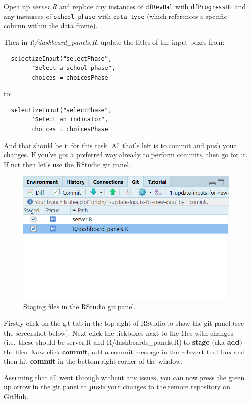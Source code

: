 \documentclass[
  12pt,
]{article}
\begin{document}
Open up \emph{server.R} and replace any instances of \texttt{dfRevBal}
with \texttt{dfProgressHE} and any instances of \texttt{school\_phase}
with \texttt{data\_type} (which references a specific column within the
data frame).

Then in \emph{R/dashboard\_panels.R}, update the titles of the input
boxes from:

\begin{verbatim}
  selectizeInput("selectPhase",
        "Select a school phase",
        choices = choicesPhase
\end{verbatim}

to:

\begin{verbatim}
  selectizeInput("selectPhase",
        "Select an indicator",
        choices = choicesPhase
\end{verbatim}

And that should be it for this task. All that's left is to commit and
push your changes. If you've got a preferred way already to perform
commits, then go for it. If not then let's use the RStudio git panel.

\begin{figure}

{\centering \includegraphics[width=0.64\linewidth]{images/gitdemo/gitdemo-RStudio-gitpanel} 

}

\caption{Staging files in the RStudio git panel.}\label{fig:unnamed-chunk-12}
\end{figure}

Firstly click on the git tab in the top right of RStudio to show the git
panel (see the screenshot below). Next click the tickboxes next to the
files with changes (i.e.~these should be server.R and
R/dashboards\_panels.R) to \textbf{stage} (aka \textbf{add}) the files.
Now click \textbf{commit}, add a commit message in the relavent text box
and then hit \textbf{commit} in the bottom right corner of the window.

Assuming that all went through without any issues, you can now press the
green up arrow in the git panel to \textbf{push} your changes to the
remote repository on GitHub.
\end{document}

